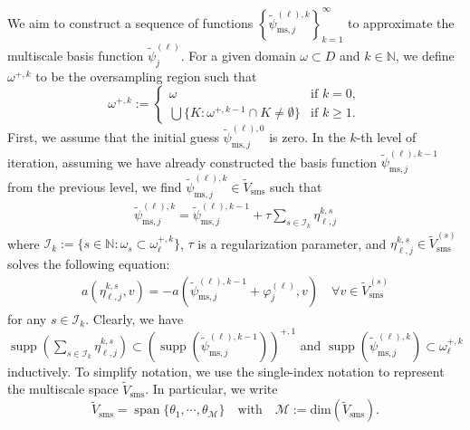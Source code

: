 \documentclass{article}[11pt]
\theoremstyle{definition}
\DeclareMathOperator{\spa}{span}
\DeclareMathOperator{\supp}{supp}
\begin{document}
\noindent 
We aim to construct a sequence of functions $\left \{ \tilde \psi_{\text{ms}, j}^{(\ell), k} \right \}_{k=1}^\infty$ to approximate the multiscale basis function $\tilde \psi_j^{(\ell)}$. %
For a given domain $\omega \subset D$ and $k \in \mathbb{N}$, we define $\omega^{+,k}$ to be the oversampling region such that 
$$ \omega^{+,k} := \left \{ 
\begin{array}{ll} 
\omega & \text{if } k = 0, \\
\bigcup \{ K : \omega^{+, k-1} \cap K \neq \emptyset \} & \text{if } k \geq 1.
\end{array} \right .$$
First, we assume that the initial guess $\tilde \psi_{\text{ms}, j}^{(\ell),0}$ is zero. In the $k$-th level of iteration, assuming we have already constructed the basis function $\tilde \psi_{\text{ms}, j}^{(\ell),k-1}$ from the previous level, we find $\tilde \psi_{\text{ms}, j}^{(\ell),k} \in \tilde V_{\text{sms}}$ such that 
\begin{eqnarray}\label{eqn:iterative-sch-1}
\tilde\psi_{\text{ms}, j}^{(\ell),k} = \tilde\psi_{\text{ms}, j}^{(\ell),k-1} + \tau \sum_{s\in \mathcal{I}_k} \eta_{\ell, j}^{k,s}
\end{eqnarray}
where $\mathcal{I}_k := \{ s \in \mathbb{N}: \omega_s \subset \omega_{\ell}^{+,k}\}$, $\tau$ is a regularization parameter, and $\eta_{\ell, j}^{k,s} \in \tilde V_{\text{sms}}^{(s)}$ solves the following equation: 
\begin{eqnarray}\label{eqn:iterative-sch-2}
a\left ( \eta_{\ell, j}^{k,s} , v \right ) = -a\left (\tilde\psi_{\text{ms}, j}^{(\ell), k-1} + \varphi_j^{(\ell)}, v\right) \quad \forall v \in \tilde V_{\text{sms}}^{(s)}
\end{eqnarray}
for any $ s\in \mathcal{I}_k$. Clearly, we have $\supp\left (\sum_{s \in \mathcal{I}_k} \eta_{\ell,j}^{k,s}\right) \subset \left ( \supp(\tilde\psi_{\text{ms},j}^{(\ell),k-1})\right )^{+,1}$ and  $\supp(\tilde\psi_{\text{ms},j}^{(\ell),k}) \subset \omega_{\ell}^{+,k}$ inductively.
To simplify notation, we use the single-index notation to represent the multiscale space $\tilde V_{\text{sms}}$. In particular, we write 
$$\tilde V_{\text{sms}} = \spa\{ \theta_1 , \cdots, \theta_{\mathcal{M}} \} \quad \text{with} \quad \mathcal{M} := \text{dim}(\tilde V_{\text{sms}}).$$
\end{document}
